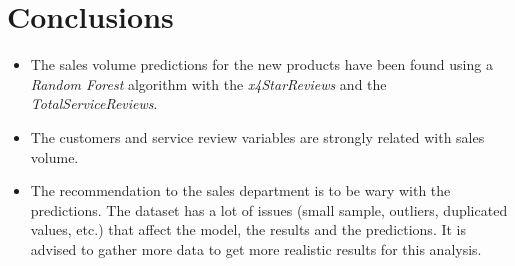 \documentclass[]{article}
\providecommand{\tightlist}{%
  \setlength{\itemsep}{0pt}\setlength{\parskip}{0pt}}
\begin{document}
\hypertarget{conclusions}{%
\section{Conclusions}\label{conclusions}}

\begin{itemize}
\tightlist
\item
  The sales volume predictions for the new products have been found
  using a \emph{Random Forest} algorithm with the \emph{x4StarReviews}
  and the \emph{TotalServiceReviews}.
\item
  The customers and service review variables are strongly related with
  sales volume.
\item
  The recommendation to the sales department is to be wary with the
  predictions. The dataset has a lot of issues (small sample, outliers,
  duplicated values, etc.) that affect the model, the results and the
  predictions. It is advised to gather more data to get more realistic
  results for this analysis.
\end{itemize}
\end{document}
